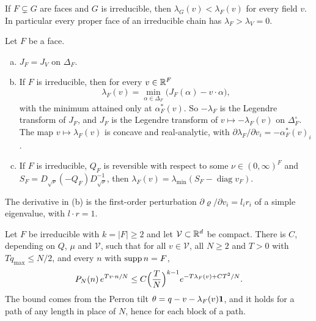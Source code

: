 \begin{lemma}\label{lem:face-monotone}
If $F\subsetneq G$ are faces and $G$ is irreducible, then
$\lambda_G(v)<\lambda_F(v)$ for every field $v$. In particular every proper face of an
irreducible chain has $\lambda_F>\lambda_V=0$.
\end{lemma}

\begin{proposition}\label{prop:variational}
Let $F$ be a face.
\begin{enumerate}[(a)]
\item $J_F=J_V$ on $\Delta_F$.
\item If $F$ is irreducible, then for every $v\in\mathbb{R}^F$
\[
 \lambda_F(v)=\min_{\alpha\in\Delta_F}\bigl(J_F(\alpha)-v\cdot\alpha\bigr),
\]
with the minimum attained only at $\alpha^*_F(v)$. So $-\lambda_F$ is the Legendre
transform of $J_F$, and $J_F$ is the Legendre transform of $v\mapsto-\lambda_F(v)$ on
$\Delta_F^\circ$. The map $v\mapsto\lambda_F(v)$ is concave and real-analytic, with
$\partial\lambda_F/\partial v_i=-\alpha^*_F(v)_i$.
\item If $F$ is irreducible, $Q_F$ is reversible with respect to some $\nu\in(0,\infty)^F$ and
$S_F=D_{\sqrt\nu}(-Q_F)D_{\sqrt\nu}^{-1}$, then
$\lambda_F(v)=\lambda_{\min}(S_F-\operatorname{diag}v_F)$.
\end{enumerate}
\end{proposition}

The derivative in (b) is the first-order perturbation $\partial\varrho/\partial v_i=l_ir_i$
of a simple eigenvalue, with $l\cdot r=1$.

\begin{lemma}\label{lem:upper}
Let $F$ be irreducible with $k=|F|\ge2$ and let $\mathcal V\subset\mathbb{R}^d$ be compact. There
is $C$, depending on $Q$, $\mu$ and $\mathcal V$, such that for all $v\in\mathcal V$, all
$N\ge2$ and $T>0$ with $Tq_{\max}\le N/2$, and every $n$ with $\operatorname{supp} n=F$,
\begin{equation}\label{eq:upper-field}
 P_N(n)\,e^{Tv\cdot n/N}\le C\Bigl(\frac TN\Bigr)^{k-1}e^{-T\lambda_F(v)+CT^2/N}.
\end{equation}
The bound comes from the Perron tilt $\theta=q-v-\lambda_F(v)\mathbf{1}$, and it holds for a path
of any length in place of $N$, hence for each block of a path.
\end{lemma}

